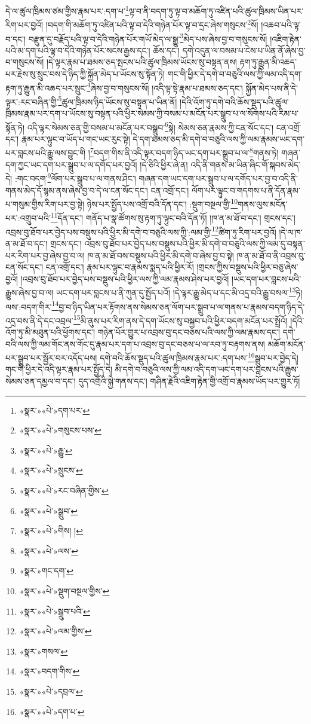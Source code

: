 དེ་ལ་ཚུལ་ཁྲིམས་ཙམ་གྱིས་རྣམ་པར་:དག་པ་\footnote{«སྣར་»«པེ་»དག་པར་}ལྟ་བ་ནི་བདག་ཏུ་ལྟ་བ་མཆོག་ཏུ་འཛིན་པའི་ཚུལ་ཁྲིམས་ཡིན་པར་རིག་པར་བྱའོ། །བདག་གི་མཆོག་ཏུ་འཛིན་པའི་ལྟ་བ་དེའི་གཉེན་པོར་ལྟ་བ་དྲང་ཞེས་གསུངས་\footnote{«སྣར་»«པེ་»གསུངས་པས་}སོ། །འཆབ་པའི་ལྟ་བ་དང་། བརྫུན་དུ་བརྗོད་པའི་ལྟ་བ་དེའི་གཉེན་པོར་གཡོ་མེད་ལ་སྒྱུ་\footnote{«སྣར་»«པེ་»རྒྱུ་}མེད་པས་ཞེས་བྱ་བ་གསུངས་སོ། །འཇིག་རྟེན་པའི་མ་དག་པའི་ལྟ་བ་དེའི་གཉེན་པོར་སངས་རྒྱས་དང་། ཆོས་དང་། དགེ་འདུན་ལ་བསམ་པ་ངེས་པ་ཡིན་ནོ་ཞེས་བྱ་བ་གསུངས་སོ། །དེ་ལྟར་རྣམ་པ་ཐམས་ཅད་སྤངས་པའི་ཚུལ་ཁྲིམས་ཡོངས་སུ་བསྟན་ནས། རྟག་ཏུ་རྒྱུན་མི་འཆད་པར་རྗེས་སུ་སྲུང་བས་དེ་ཉིད་ཀྱི་སྐྱོན་མེད་པ་ཡོངས་སུ་སྟོན་ཏེ། གང་གི་ཕྱིར་དེ་དགེ་བ་བཅུའི་ལས་ཀྱི་ལམ་འདི་དག་རྟག་ཏུ་རྒྱུན་མི་འཆད་པར་སྲུང་\footnote{«སྣར་»«པེ་»སྲུངས་}ཞེས་བྱ་བ་གསུངས་སོ། །འདི་ལྟ་སྟེ་རྣམ་པ་ཐམས་ཅད་དང་། སྐྱོན་མེད་པས་ནི་དེ་ལྟར་:རང་བཞིན་གྱི་\footnote{«སྣར་»«པེ་»རང་བཞིན་གྱིས་}ཚུལ་ཁྲིམས་ཉིད་ཡོངས་སུ་བསྟན་པ་ཡིན་ནོ། །དེའི་འོག་ཏུ་དགེ་བའི་ཆོས་སྡུད་པའི་ཚུལ་ཁྲིམས་རྣམ་པར་དག་པ་ཡོངས་སུ་བསྟན་པའི་ཕྱིར་སེམས་ཀྱི་བསམ་པ་མངོན་པར་སྒྲུབ་པ་ལ་སོགས་པའི་རིམ་པ་སྟོན་ཏེ། འདི་ལྟར་སེམས་ཅན་གྱི་བསམ་པ་མངོན་པར་བསྒྲུབ་\footnote{«སྣར་»«པེ་»སྒྲུབ་}སྟེ། སེམས་ཅན་རྣམས་ཀྱི་ངན་སོང་དང་། ངན་འགྲོ་དང་། རྣམ་པར་ལྟུང་བ་ཡོད་པ་གང་ཡང་རུང་སྟེ། དེ་དག་ཐམས་ཅད་མི་དགེ་བ་བཅུའི་ལས་ཀྱི་ལམ་རྣམས་ཡང་དག་པར་བླངས་པའི་རྒྱུ་ལས་བྱུང་གི །\footnote{«སྣར་»«པེ་»གིས། །}བདག་གིས་ནི་འདི་ལྟར་བདག་ཉིད་ཡང་དག་པར་སྒྲུབ་པ་ལ་\footnote{«སྣར་»«པེ་»ལས་}གནས་ཏེ། གཞན་དག་ཀྱང་ཡང་དག་པར་སྒྲུབ་པ་ལ་དགོད་པར་བྱའོ། །དེ་ཅིའི་ཕྱིར་ཞེ་ན། འདི་ནི་གནས་མ་ཡིན་ཞིང་གོ་སྐབས་མེད་དེ། :གང་བདག་\footnote{«སྣར་»གང་དག་}ལོག་པར་སྒྲུབ་པ་ལ་གནས་ཤིང་། གཞན་དག་ཡང་དག་པར་སྒྲུབ་པ་ལ་དགོད་པར་བྱ་བ་འདི་ནི་གནས་མེད་དོ་སྙམ་ནས་ཞེས་བྱ་བ་དེ་ལ་ངན་སོང་དང་། ངན་འགྲོ་དང་། ལོག་པར་ལྟུང་བ་གདགས་པ་ནི་དོན་རྣམ་པ་གསུམ་གྱིས་རིག་པར་བྱ་སྟེ། ཉེས་པར་སྤྱོད་པས་འགྲོ་བའི་དོན་དང་། :སྡུག་བསྔལ་གྱི་\footnote{«སྣར་»«པེ་»སྡུག་བསྔལ་གྱིས་}གནས་ལུས་མངོན་པར་:འགྲུབ་པའི་\footnote{«སྣར་»«པེ་»སྒྲུབ་པའི་}དོན་དང་། གནོད་པ་སྣ་ཚོགས་སུ་རྟག་ཏུ་ལྟུང་བའི་དོན་ཏོ། །ཁ་ན་མ་ཐོ་བ་དང་། གྲངས་དང་། འབྲས་བུ་ཐོབ་པར་བྱེད་པས་བསྡུས་པའི་ཕྱིར་མི་དགེ་བ་བཅུའི་ལས་ཀྱི་:ལམ་གྱི་\footnote{«སྣར་»«པེ་»ལམ་གྱིས་}ཚིག་ཏུ་རིག་པར་བྱའོ། །དེ་ལ་ཁ་ན་མ་ཐོ་བ་དང་། གྲངས་དང་། འབྲས་བུ་ཐོབ་པར་བྱེད་པས་བསྡུས་པའི་ཕྱིར་མི་དགེ་བ་བཅུའི་ལས་ཀྱི་ལམ་དུ་བསྟན་པར་རིག་པར་བྱ་ཞེས་བྱ་བ་ལ། ཁ་ན་མ་ཐོ་བས་བསྡུས་པའི་ཕྱིར་མི་དགེ་བ་ཞེས་བྱ་བ་སྟེ། ཁ་ན་མ་ཐོ་བ་ནི་འབྲས་བུ་ངན་སོང་དང་། ངན་འགྲོ་དང་། རྣམ་པར་ལྟུང་བ་རྣམས་སྨད་པའི་ཕྱིར་རོ། །གྲངས་ཀྱིས་བསྡུས་པའི་ཕྱིར་བཅུ་ཞེས་བྱའོ། །འབྲས་བུ་ཐོབ་པར་བྱེད་པས་བསྡུས་པའི་ཕྱིར་ལས་ཀྱི་ལམ་རྣམས་ཤེས་པར་བྱའོ། །ཡང་དག་པར་བླངས་པའི་རྒྱུས་ཞེས་བྱ་བ་ལ། ཡང་དག་པར་བླངས་པ་ནི་ཀུན་དུ་སྤྱོད་པའོ། །དེ་ལྟར་རྒྱུ་མེད་པ་དང་མི་འདྲ་བའི་རྒྱུ་བསལ་\footnote{«སྣར་»གསལ་}ཏེ། ལས་:བདག་གིར་\footnote{«སྣར་»བདག་གིས་}བྱ་བ་ཉིད་ཡིན་པར་རྟོགས་ནས་སེམས་ཅན་ལོག་པར་སྒྲུབ་པ་ལ་གནས་པ་རྣམས་བདག་ཉིད་དེ་འདྲ་བས་ནི་དེ་དང་འབྲལ་\footnote{«སྣར་»«པེ་»དབྲལ་}མི་ནུས་པར་རིག་ནས་དེ་དག་ཡོངས་སུ་བསྐྱབ་པའི་ཕྱིར་བདག་མངོན་པར་སྤྲོའོ། །དེའི་འོག་ཏུ་མི་མཐུན་པའི་ཕྱོགས་དང་། གཉེན་པོར་གྱུར་པ་འབྲས་བུ་དང་བཅས་པའི་ལས་ཀྱི་ལམ་རྣམས་དང་། དགེ་བའི་ལས་ཀྱི་ལམ་གོང་ནས་གོང་དུ་རྣམ་པར་དག་པ་འབྲས་བུ་དང་བཅས་པ་ལ་རབ་ཏུ་བརྟགས་ནས། མཆོག་མངོན་པར་སྒྲུབ་པར་སྦྱོར་བར་འདོད་པས། དགེ་བའི་ཆོས་སྡུད་པའི་ཚུལ་ཁྲིམས་རྣམ་པར་:དག་པས་\footnote{«སྣར་»«པེ་»དག་པ་}སྒྲུབ་པར་བྱེད་དེ། གང་གི་ཕྱིར་དེ་འདི་ལྟར་རྣམ་པར་སྤྱོད་དེ། མི་དགེ་བ་བཅུའི་ལས་ཀྱི་ལམ་འདི་དག་ཡང་དག་པར་བླངས་པའི་རྒྱུས་སེམས་ཅན་དམྱལ་བ་དང་། དུད་འགྲོའི་སྐྱེ་གནས་དང་། གཤིན་རྗེའི་འཇིག་རྟེན་གྱི་འགྲོ་བ་རྣམས་ཡོད་པར་གྱུར་ཏོ། 